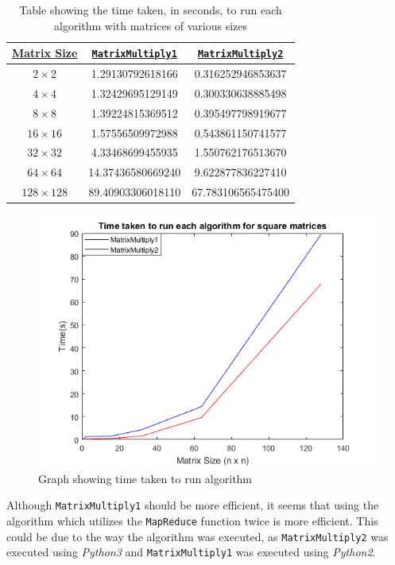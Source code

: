 \documentclass[10pt, conference]{IEEEtran}
\def\code#1{\texttt{#1}}
\begin{document}
\begin{table}[h!]
\centering
\caption{Table showing the time taken, in seconds, to run each algorithm with matrices of various sizes}
\label{table}
\begin{tabular}{|c|c|c|}
\hline
{\ul \textbf{Matrix Size}} & {\ul \textbf{\code{MatrixMultiply1}}} & {\ul \textbf{\code{MatrixMultiply2}}} \\ \hline
\textbf{$2\times 2$} & 1.29130792618166 & 0.316252946853637 \\ \hline
\textbf{$4\times 4$} & 1.32429695129149 & 0.300330638885498 \\ \hline
\textbf{$8\times 8$} & 1.39224815369512 & 0.395497798919677 \\ \hline
\textbf{$16\times 16$} & 1.57556509972988 & 0.543861150741577 \\ \hline
\textbf{$32\times 32$} & 4.33468699455935 & 1.550762176513670 \\ \hline
\textbf{$64\times 64$} & 14.37436580669240 & 9.622877836227410 \\ \hline
\textbf{$128\times 128$} & 89.40903306018110 & 67.783106565475400 \\ \hline
\end{tabular}
\end{table}

\begin{figure}[h!]
\renewcommand{\thefigure}{\arabic{figure}}
\centering
\includegraphics[scale=0.65]{Graph.png}
\caption{Graph showing time taken to run algorithm}
\label{graph}
\end{figure}

Although \code{MatrixMultiply1} should be more efficient, it seems that using the algorithm which utilizes the \code{MapReduce} function twice is more efficient. This could be due to the way the algorithm was executed, as \code{MatrixMultiply2} was executed using \emph{Python3} and \code{MatrixMultiply1} was executed using \emph{Python2}.
\end{document}
